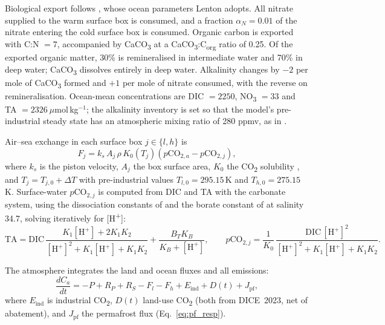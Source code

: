 Biological export follows \citet{knoxChangesAtmosphericCO21984}, whose ocean parameters Lenton adopts. All nitrate supplied to the warm surface box is consumed, and a fraction $\alpha_N = 0.01$ of the nitrate entering the cold surface box is consumed. Organic carbon is exported with C:N $= 7$, accompanied by CaCO\textsubscript{3} at a CaCO\textsubscript{3}:C\textsubscript{org} ratio of 0.25. Of the exported organic matter, 30\% is remineralised in intermediate water and 70\% in deep water; CaCO\textsubscript{3} dissolves entirely in deep water. Alkalinity changes by $-2$ per mole of CaCO\textsubscript{3} formed and $+1$ per mole of nitrate consumed, with the reverse on remineralisation. Ocean-mean concentrations are DIC $= 2250$, NO\textsubscript{3} $= 33$ and TA $= 2326\ \mu$mol\,kg$^{-1}$; the alkalinity inventory is set so that the model's pre-industrial steady state has an atmospheric mixing ratio of 280 ppmv, as in \citet{lentonLandOceanCarbon2000}.

Air--sea exchange in each surface box $j \in \{l, h\}$ is
\begin{equation}
F_j = k_s\, A_j\, \rho\, K_0(T_j)\left(p\text{CO}_{2,a} - p\text{CO}_{2,j}\right),
\label{eq:oceanflux}
\end{equation}
where $k_s$ is the piston velocity, $A_j$ the box surface area, $K_0$ the CO\textsubscript{2} solubility \citep{weissCarbonDioxideWater1974}, and $T_j = T_{j,0} + \Delta T$ with pre-industrial values $T_{l,0} = 295.15$\,K and $T_{h,0} = 275.15$\,K. Surface-water $p\text{CO}_{2,j}$ is computed from DIC and TA with the carbonate system, using the dissociation constants of \citet{goyetNewDeterminationCarbonic1989} and the borate constant of \citet{dicksonThermodynamicsDissociationBoric1990} at salinity 34.7, solving iteratively for [H\textsuperscript{+}]:
\begin{equation}
\text{TA} = \text{DIC}\,\frac{K_1[\text{H}^+] + 2K_1K_2}{[\text{H}^+]^2 + K_1[\text{H}^+] + K_1K_2} + \frac{B_T K_B}{K_B + [\text{H}^+]}, \qquad
p\text{CO}_{2,j} = \frac{1}{K_0}\,\frac{\text{DIC}\,[\text{H}^+]^2}{[\text{H}^+]^2 + K_1[\text{H}^+] + K_1K_2}.
\label{eq:carbonate}
\end{equation}

The atmosphere integrates the land and ocean fluxes and all emissions:
\begin{equation}
\frac{dC_a}{dt} = -P + R_P + R_S - F_l - F_h + E_{\text{ind}} + D(t) + J_{\text{pf}},
\label{eq:atm}
\end{equation}
where $E_{\text{ind}}$ is industrial CO\textsubscript{2}, $D(t)$ land-use CO\textsubscript{2} (both from DICE~2023, net of abatement), and $J_{\text{pf}}$ the permafrost flux (Eq.~\ref{eq:pf_resp}).


